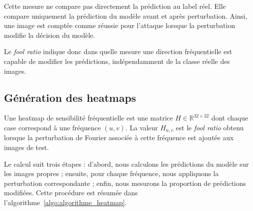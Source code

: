 Cette mesure ne compare pas directement la prédiction au label réel. Elle compare uniquement la
prédiction du modèle avant et après perturbation. Ainsi, une image est comptée comme réussie pour
l'attaque lorsque la perturbation modifie la décision du modèle.

Le \textit{fool ratio} indique donc dans quelle mesure une direction fréquentielle est capable de modifier
les prédictions, indépendamment de la classe réelle des images.




\subsection{Génération des heatmaps}
\label{subsec:generation_heatmaps}

Une heatmap de sensibilité fréquentielle est une matrice $H \in \mathbb{R}^{32\times32}$ dont chaque
case correspond à une fréquence $(u,v)$. La valeur $H_{u,v}$ est le \textit{fool ratio} obtenu lorsque
la perturbation de Fourier associée à cette fréquence est ajoutée aux images de test.

Le calcul suit trois étapes : d'abord, nous calculons les prédictions du modèle sur les images propres ;
ensuite, pour chaque fréquence, nous appliquons la perturbation correspondante ; enfin, nous mesurons
la proportion de prédictions modifiées. Cette procédure est résumée dans
l'algorithme~\ref{algo:algorithme_heatmap}.

